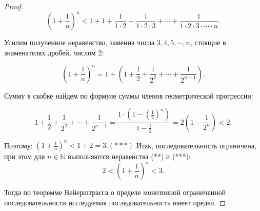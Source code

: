 \begin{proof}
        $$(1+\frac{1}{n})^{n}<1+1+\frac{1}{1\cdot 2}+\frac{1}{1\cdot 2\cdot 3}+ \cdots +\frac{1}{1\cdot 2\cdot 3\cdot \cdots \cdot n}.$$

        Усилим полученное неравенство, заменив числа $3, 4, 5, \cdots, n $, стоящие в знаменателях дробей, числом 2:

        $$(1+\frac{1}{n})^{n} = 1+ (1+\frac{1}{2}+\frac{1}{2^2}+\cdots +\frac{1}{2^{n-1}}).$$

        Сумму в скобке найдем по формуле суммы членов геометрической прогрессии:

        $$1+\frac{1}{2}+\frac{1}{2^2}+ \cdots +\frac{1}{2^{n-1}} = \frac{1\cdot (1- (\frac{1}{2})^n)}{1-\frac{1}{2}}= 2 (1-\frac{1}{2^n})<2.$$

        Поэтому: $(1+\frac{1}{n})^{n}<1+2= 3. (***)$
        Итак, последовательность ограничена, при этом для $n \in \mathbb{N}$ выполняются неравенства (**) и (***):
        $$2 < (1+\frac{1}{n})^{n}<3.$$

        Тогда по теоремме Вейерштрасса о пределе монотонной ограниченной последовательности исследуемая последовательность имеет предел.
\end{proof}

